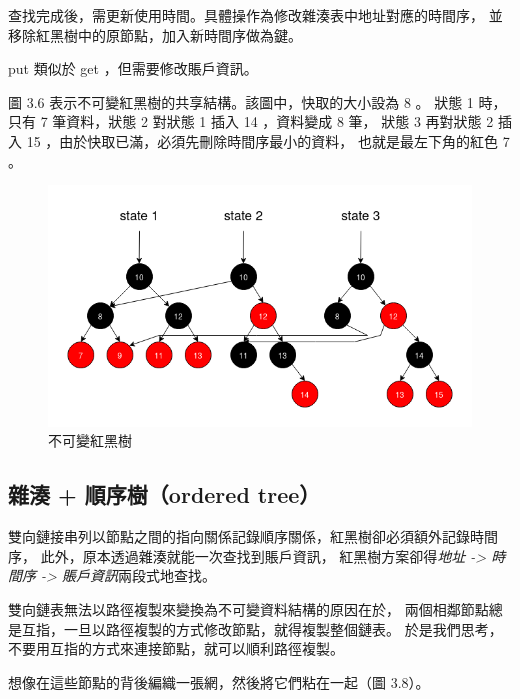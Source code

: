 查找完成後，需更新使用時間。具體操作為修改雜湊表中地址對應的時間序，
並移除紅黑樹中的原節點，加入新時間序做為鍵。

put 類似於 get ，但需要修改賬戶資訊。

圖 3.6 表示不可變紅黑樹的共享結構。該圖中，快取的大小設為 8 。
狀態 1 時，只有 7 筆資料，狀態 2 對狀態 1 插入 14 ，資料變成 8 筆，
狀態 3 再對狀態 2 插入 15 ，由於快取已滿，必須先刪除時間序最小的資料，
也就是最左下角的紅色 7 。

\begin{figure}[h!]
\includegraphics[width=\textwidth]{不可變紅黑樹}
\caption{不可變紅黑樹}
\end{figure}


\subsection{雜湊 + 順序樹（ordered tree）}

雙向鏈接串列以節點之間的指向關係記錄順序關係，紅黑樹卻必須額外記錄時間序，
此外，原本透過雜湊就能一次查找到賬戶資訊，
紅黑樹方案卻得\emph{地址 -> 時間序 -> 賬戶資訊}兩段式地查找。

雙向鏈表無法以路徑複製來變換為不可變資料結構的原因在於，
兩個相鄰節點總是互指，一旦以路徑複製的方式修改節點，就得複製整個鏈表。
於是我們思考，不要用互指的方式來連接節點，就可以順利路徑複製。

想像在這些節點的背後編織一張網，然後將它們粘在一起（圖 3.8）。

